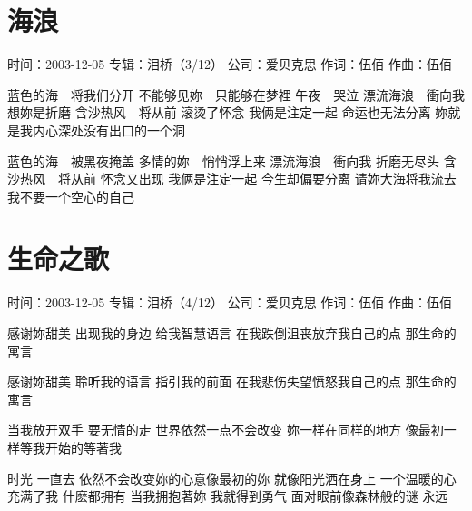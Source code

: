 \documentclass[UTF8,a4paper,oneside,twocolumn,12pt]{ctexbook}
\newcommand{\infopair}[2]{\textbullet #1：#2}
\newcommand{\zc}[1][伍佰]{\infopair{作词}{#1}}
\newcommand{\zq}[1][伍佰]{\infopair{作曲}{#1}}
\newcommand{\zj}[1]{\infopair{专辑}{#1}}
\newcommand{\sj}[1]{\infopair{时间}{#1}}
\newcommand{\gs}[1]{\infopair{公司}{#1}}
\newenvironment{info}{\begin{flushleft}\kaishu
	}
	{\end{flushleft}\normalsize\yahei\par}
\newenvironment{lyric}{
	}
{}
\begin{document}
\section{海浪}
\begin{info}
	\sj{2003-12-05}
	\zj{泪桥（3/12）}
	\gs{爱贝克思}
	\zc
	\zq
\end{info}
\begin{lyric}
	蓝色的海　将我们分开
	不能够见妳　只能够在梦裡
	午夜　哭泣
	漂流海浪　衝向我
	想妳是折磨
	含沙热风　将从前
	滚烫了怀念
	我俩是注定一起
	命运也无法分离
	妳就是我内心深处没有出口的一个洞

	蓝色的海　被黑夜掩盖
	多情的妳　悄悄浮上来
	漂流海浪　衝向我
	折磨无尽头
	含沙热风　将从前
	怀念又出现
	我俩是注定一起
	今生却偏要分离
	请妳大海将我流去
	我不要一个空心的自己
\end{lyric}

\section{生命之歌}
\begin{info}
	\sj{2003-12-05}
	\zj{泪桥（4/12）}
	\gs{爱贝克思}
	\zc
	\zq
\end{info}
\begin{lyric}
	感谢妳甜美 出现我的身边 给我智慧语言
	在我跌倒沮丧放弃我自己的点 那生命的寓言

	感谢妳甜美 聆听我的语言 指引我的前面
	在我悲伤失望愤怒我自己的点 那生命的寓言

	当我放开双手 要无情的走 世界依然一点不会改变
	妳一样在同样的地方 像最初一样等我开始的等著我

	时光 一直去 依然不会改变妳的心意像最初的妳
	就像阳光洒在身上 一个温暖的心充满了我 什麽都拥有
	当我拥抱著妳 我就得到勇气 面对眼前像森林般的谜 永远
\end{lyric}
\end{document}
